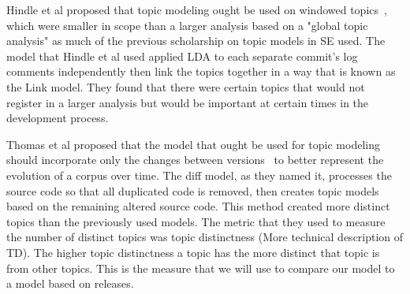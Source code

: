 Hindle et al proposed that topic modeling ought be used on windowed topics~\cite{Hindle-etal:2009}, which were smaller in scope than a larger analysis based on a "global topic analysis" as much of the previous scholarship on topic models in SE used.
The model that Hindle et al used applied LDA to each separate commit's log comments independently then link the topics together in a way that is known as the Link model.
They found that there were certain topics that would not register in a larger analysis but would be important at certain times in the development process.

Thomas et al proposed that the model that ought be used for topic modeling should incorporate only the changes between versions~\cite{Thomas-etal:2011} to better represent the evolution of a corpus over time.
The diff model, as they named it, processes the source code so that all duplicated code is removed, then creates topic models based on the remaining altered source code.
This method created more distinct topics than the previously used models.
The metric that they used to measure the number of distinct topics was topic distinctness (More technical description of TD).
The higher topic distinctness a topic has the more distinct that topic is from other topics.
This is the measure that we will use to compare our model to a model based on releases.

\begin{comment}
Software source code is often compiled through a series of commits that change the source code between releases.
These commits can be of many sizes from a small change in a function to additions of many functions.
The person who commits these changes is seen as being the owner of the code~\cite{Corley-etal:2012}.
The owner of the code is assumed to have a greater working knowledge of the code in question than other members of the design team.
Being able to determine who would know most about a certain topic would allow someone working on a design team to know who is best fit to solve an issue pertaining to a certain topic.
Unfortunately, most of the topic modeling that is currently used to determine ownership is only based off of larger releases rather than intermediate changes.
These types of topic models can be problematic if you are working between releases.
Think for a second that you are a project manager at a software company with a rapidly approaching release deadline.
There is a problem of some sort with the code, and through the use of a topic model you could be able to identify precisely who should be delegated the task of fixing it.
With the type of dynamic topic model like we are proposing, this is easily attainable.
A model based on the change sets between commits would allow software developers never to have an obsolete model.
While there has been some research in the use of commit log comments~\cite{Hindle-etal:2009}, we are not aware of any analyses of topic models that have been created by using the differences of the source code between commits.
\end{comment}
